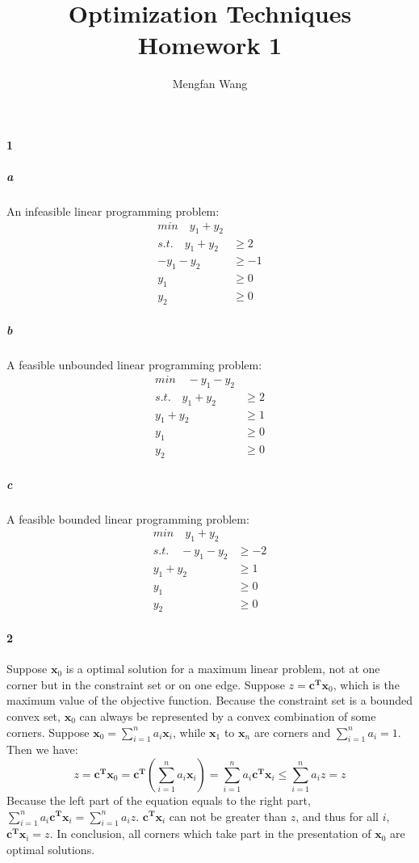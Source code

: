 \documentclass[22pt]{article}
\author{Mengfan Wang}
\title{Optimization Techniques Homework 1}
\begin{document}
	\maketitle 
	\paragraph{1}
		\subparagraph{a} An infeasible linear programming problem:
		\begin{align}
			min \quad y_1+y_2\\
			s.t. \quad y_1+y_2 & \geq 2\\
					   -y_1 - y_2 & \geq -1\\
					   y_1 & \geq 0\\
					   y_2 & \geq 0
		\end{align}
		\subparagraph{b} A feasible unbounded linear programming problem:
		\begin{align}
			min \quad -y_1-y_2\\
			s.t. \quad y_1+y_2 & \geq 2\\
					   y_1 + y_2 & \geq 1\\
					   y_1 & \geq 0\\
					   y_2 & \geq 0
		\end{align}
		\subparagraph{c} A feasible bounded linear programming problem:
		\begin{align}
			min \quad y_1+y_2\\
			s.t. \quad -y_1-y_2 & \geq -2\\
					   y_1 + y_2 & \geq 1\\
					   y_1 & \geq 0\\
					   y_2 & \geq 0
		\end{align}

	\paragraph{2}Suppose $\mathbf{x}_0$ is a optimal solution for a maximum linear problem, not at one corner but in the constraint set or on one edge. Suppose $z = \mathbf{c^Tx}_0$, which is the maximum value of the objective function. Because the constraint set is a bounded convex set, $\mathbf{x}_0$ can always be represented by a convex combination of some corners. Suppose $\mathbf{x}_0 = \sum\limits_{i=1}^{n}a_i\mathbf{x}_i$, while $\mathbf{x}_1$ to $\mathbf{x}_n$ are corners and $\sum\limits_{i=1}^{n}a_i = 1$. Then we have:
	\begin{equation}
		z = \mathbf{c^Tx}_0 = \mathbf{c^T}(\sum\limits_{i=1}^na_i\mathbf{x}_i) = \sum\limits_{i=1}^na_i\mathbf{c^Tx}_i \leq \sum\limits_{i=1}^na_iz = z
	\end{equation}
	Because the left part of the equation equals to the right part, $\sum\limits_{i=1}^na_i\mathbf{c^Tx}_i = \sum\limits_{i=1}^na_iz$. $\mathbf{c^Tx}_i$ can not be greater than $z$, and thus for all $i$, $\mathbf{c^Tx}_i = z$. In conclusion, all corners which take part in the presentation of $\mathbf{x}_0$ are optimal solutions. 
\end{document}

